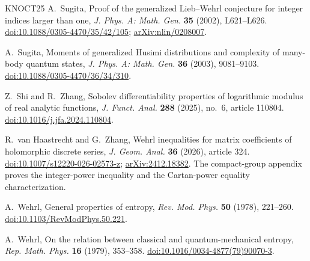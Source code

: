 \documentclass[11pt,reqno]{amsart}
\numberwithin{equation}{section}
\theoremstyle{plain}
\theoremstyle{remark}
\begin{document}
\begin{thebibliography}{KNOCT25}
A.~Sugita,
Proof of the generalized Lieb--Wehrl conjecture for integer indices larger
than one,
\emph{J. Phys. A: Math. Gen.} \textbf{35} (2002), L621--L626.
\href{https://doi.org/10.1088/0305-4470/35/42/105}{doi:10.1088/0305-4470/35/42/105};
\href{https://arxiv.org/abs/nlin/0208007}{arXiv:nlin/0208007}.

A.~Sugita,
Moments of generalized Husimi distributions and complexity of many-body
quantum states,
\emph{J. Phys. A: Math. Gen.} \textbf{36} (2003), 9081--9103.
\href{https://doi.org/10.1088/0305-4470/36/34/310}{doi:10.1088/0305-4470/36/34/310}.

Z.~Shi and R.~Zhang,
Sobolev differentiability properties of logarithmic modulus of real analytic functions,
\emph{J. Funct. Anal.} \textbf{288} (2025), no.~6, article 110804.
\href{https://doi.org/10.1016/j.jfa.2024.110804}{doi:10.1016/j.jfa.2024.110804}.

R.~van Haastrecht and G.~Zhang,
Wehrl inequalities for matrix coefficients of holomorphic discrete series,
\emph{J. Geom. Anal.} \textbf{36} (2026), article 324.
\href{https://doi.org/10.1007/s12220-026-02573-z}{doi:10.1007/s12220-026-02573-z};
\href{https://arxiv.org/abs/2412.18382}{arXiv:2412.18382}.
The compact-group appendix proves the integer-power inequality and the
Cartan-power equality characterization.

A.~Wehrl,
General properties of entropy,
\emph{Rev. Mod. Phys.} \textbf{50} (1978), 221--260.
\href{https://doi.org/10.1103/RevModPhys.50.221}{doi:10.1103/RevModPhys.50.221}.

A.~Wehrl,
On the relation between classical and quantum-mechanical entropy,
\emph{Rep. Math. Phys.} \textbf{16} (1979), 353--358.
\href{https://doi.org/10.1016/0034-4877(79)90070-3}{doi:10.1016/0034-4877(79)90070-3}.

\end{thebibliography}
\end{document}
